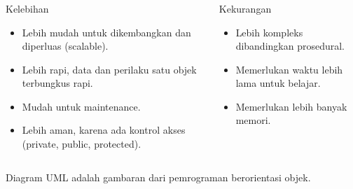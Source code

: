 \documentclass{../praktikum-ppt}
\begin{document}
  \begin{frame}
    \frametitle{\insertsection}
    \framesubtitle{\insertsubsection}
    \begin{columns}
      \begin{column}{0.45\textwidth}
        \begin{block}{Kelebihan}
          \begin{itemize}
            \item Lebih mudah untuk dikembangkan dan diperluas (scalable).
            \item Lebih rapi, data dan perilaku satu objek terbungkus rapi.
            \item Mudah untuk maintenance.
            \item Lebih aman, karena ada kontrol akses (private, public, protected).
          \end{itemize}
        \end{block}
      \end{column}
      \begin{column}{0.5\textwidth}
        \begin{block}{Kekurangan}
          \begin{itemize}
            \item Lebih kompleks dibandingkan prosedural.
            \item Memerlukan waktu lebih lama untuk belajar.
            \item Memerlukan lebih banyak memori.
          \end{itemize}
        \end{block}
      \end{column}
    \end{columns}
    \begin{contoh}
      Diagram UML adalah gambaran dari pemrograman berorientasi objek.
    \end{contoh}
  \end{frame}
\end{document}
